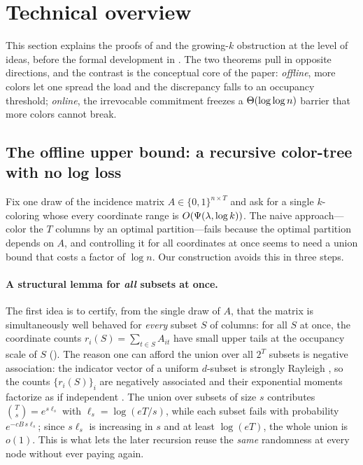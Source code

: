 \section{Technical overview}\label{sec:overview}

This section explains the proofs of  and the growing-$k$ obstruction at the level
of ideas, before the formal development in . The two theorems pull in
opposite directions, and the contrast is the conceptual core of the paper: \emph{offline}, more colors let one spread the
load and the discrepancy falls to an occupancy threshold; \emph{online}, the irrevocable commitment freezes a
$\Theta(\log\log n)$ barrier that more colors cannot break.

\subsection{The offline upper bound: a recursive color-tree with no log loss}\label{sec:ov-offline-upper}

Fix one draw of the incidence matrix $A\in\{0,1\}^{n\times T}$ and ask for a single $k$-coloring whose every coordinate range
is $O(\Psi(\lambda,\log k))$. The naive approach---color the $T$ columns by an optimal partition---fails because the optimal
partition depends on $A$, and controlling it for all coordinates at once seems to need a union bound that costs a factor of
$\log n$. Our construction avoids this in three steps.

\paragraph{A structural lemma for \emph{all} subsets at once.}
The first idea is to certify, from the single draw of $A$, that the matrix is simultaneously well behaved for \emph{every}
subset $S$ of columns: for all $S$ at once, the coordinate counts $r_i(S)=\sum_{t\in S}A_{it}$ have small upper tails at the
occupancy scale of $S$ (). The reason one can afford the union over all $2^T$ subsets is negative
association: the indicator vector of a uniform $d$-subset is strongly Rayleigh \cite{BorceaBrandenLiggett2009}, so the counts
$\{r_i(S)\}_i$ are negatively associated and their exponential moments factorize as if independent
\cite{JoagDevProschan1983,DubhashiRanjan1998}. The union over subsets of size $s$ contributes $\binom{T}{s}=e^{s\ell_s}$ with
$\ell_s=\log(eT/s)$, while each subset fails with probability $e^{-cB\,s\ell_s}$; since $s\ell_s$ is increasing in $s$ and at
least $\log(eT)$, the whole union is $o(1)$. This is what lets the later recursion reuse the \emph{same} randomness at every
node without ever paying again.

